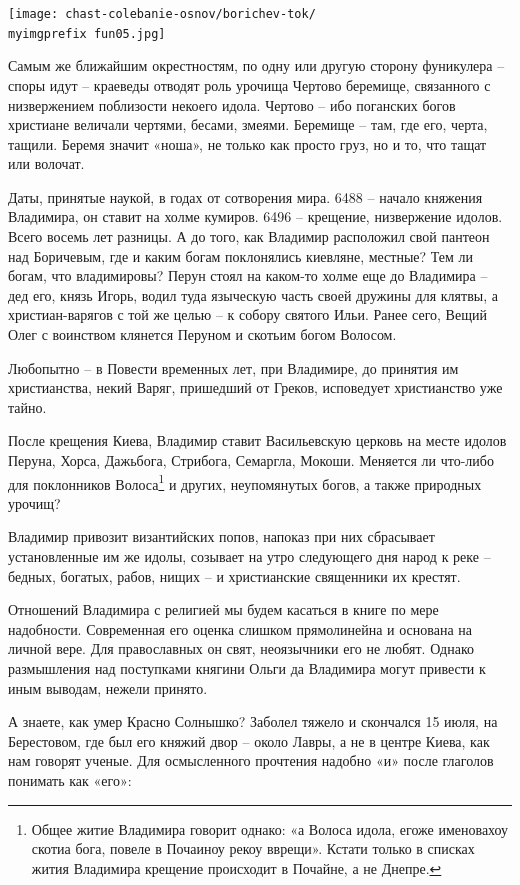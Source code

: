 \begin{center}
\texttt{[image: chast-colebanie-osnov/borichev-tok/\\myimgprefix fun05.jpg]}
\end{center}

Самым же ближайшим окрестностям, по одну или другую сторону фуникулера – споры идут – краеведы отводят роль урочища Чертово беремище, связанного с низвержением поблизости некоего идола. Чертово – ибо поганских богов христиане величали чертями, бесами, змеями. Беремище – там, где его, черта, тащили. Беремя значит «ноша», не только как просто груз, но и то, что тащат или волочат.

Даты, принятые наукой, в годах от сотворения мира. 6488 – начало княжения Владимира, он ставит на холме кумиров. 6496 – крещение, низвержение идолов. Всего восемь лет разницы. А до того, как Владимир расположил свой пантеон над Боричевым, где и каким богам поклонялись киевляне, местные? Тем ли богам, что владимировы? Перун стоял на каком-то холме еще до Владимира – дед его, князь Игорь, водил туда языческую часть своей дружины для клятвы, а христиан-варягов с той же целью – к собору святого Ильи. Ранее сего, Вещий Олег с воинством клянется Перуном и скотьим богом Волосом.

Любопытно – в Повести временных лет, при Владимире, до принятия им христианства, некий Варяг, пришедший от Греков, исповедует христианство уже тайно.

После крещения Киева, Владимир ставит Васильевскую церковь на месте идолов Перуна, Хорса, Дажьбога, Стрибога, Семаргла, Мокоши. Меняется ли что-либо для поклонников Волоса\footnote{Общее житие Владимира говорит однако: «а Волоса идола, егоже именовахоу скотиа бога, повеле в Почаиноу рекоу вврещи». Кстати только в списках жития Владимира крещение происходит в Почайне, а не Днепре.} и других, неупомянутых богов, а также природных урочищ?

Владимир привозит византийских попов, напоказ при них сбрасывает установленные им же идолы, созывает на утро следующего дня народ к реке – бедных, богатых, рабов, нищих – и христианские священники их крестят.
 
Отношений Владимира с религией мы будем касаться в книге по мере надобности. Современная его оценка слишком прямолинейна и основана на личной вере. Для православных он свят, неоязычники его не любят. Однако размышления над поступками княгини Ольги да Владимира могут привести к иным выводам, нежели принято.

А знаете, как умер Красно Солнышко? Заболел тяжело и скончался 15 июля, на Берестовом, где был его княжий двор – около Лавры, а не в центре Киева, как нам говорят ученые. Для осмысленного прочтения надобно «и» после глаголов понимать как «его»:

